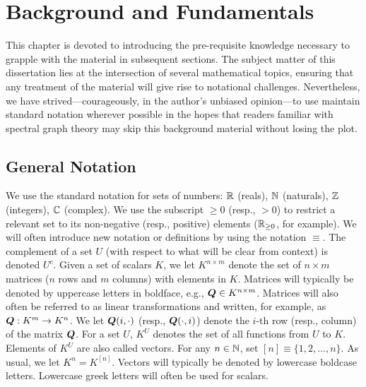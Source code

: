 \chapter{Background and Fundamentals}
\label{sec:background}
This chapter is devoted to introducing the  pre-requisite knowledge necessary to grapple with the material in subsequent sections. The subject matter of this dissertation lies at the intersection of several mathematical topics, ensuring that any treatment  of the material will give rise to notational challenges. Nevertheless, we have strived---courageously, in the author's unbiased opinion---to use maintain standard notation wherever possible in the hopes that readers familiar with spectral graph theory may skip this background material without losing the plot. 


\section{General Notation}
\label{sec:background_general}
We use the standard notation for sets of numbers: $\mathbb{R}$ (reals), $\mathbb{N}$ (naturals), $\mathbb{Z}$ (integers), $\mathbb{C}$ (complex).  We use the subscript $\geq 0$ (resp., $>0$) to restrict a relevant set to its non-negative (resp., positive) elements ($\mathbb{R}_{\geq 0}$, for example). 
We will often introduce new notation or definitions by using the notation $\equiv$. The complement of a set $U$ (with respect to what will be clear from context) is denoted $U^c$. 
Given a set of scalars $K$, we let $K^{n\times m}$ denote the set of $n\times m$ matrices ($n$ rows and $m$ columns) with elements in $K$. Matrices will typically be denoted by uppercase letters in boldface, e.g., $\vb*{Q}\in K^{n\times m}$. Matrices will also often be referred to as linear transformations and written, for example, as $\vb*{Q}:K^m \to K^n$. 
We let $\vb*{Q}(i,\cdot)$ (resp., $\vb*{Q}(\cdot,i)$) denote the $i$-th row (resp., column) of the matrix $\vb*{Q}$. 
For a set $U$, $K^U$ denotes the set of all functions from $U$ to $K$.  Elements of $K^U$ are also called vectors. For any $n\in\mathbb{N}$, set $[n]\equiv \{1,2,\dots,n\}$. As usual, we let $K^n=K^{[n]}$.  Vectors will typically be denoted by lowercase boldcase letters. Lowercase  greek letters will often be used for scalars. 

